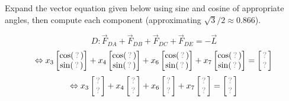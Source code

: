 \begin{activity}{10}
Expand the vector equation given below using sine and cosine of appropriate angles,
then compute each component (approximating \(\sqrt{3}/2\approx 0.866\)).

\drawtruss{\trussStrutVariables}

\[
D:\vec F_{DA}+\vec F_{DB}+\vec F_{DC}+\vec F_{DE}=-\vec L
\]
\[
\Leftrightarrow
x_3\begin{bmatrix}\cos(\unknown)\\\sin(\unknown)\end{bmatrix}+
x_4\begin{bmatrix}\cos(\unknown)\\\sin(\unknown)\end{bmatrix}+
x_6\begin{bmatrix}\cos(\unknown)\\\sin(\unknown)\end{bmatrix}+
x_7\begin{bmatrix}\cos(\unknown)\\\sin(\unknown)\end{bmatrix}=
\begin{bmatrix}\unknown\\\unknown\end{bmatrix}
\]
\[
\Leftrightarrow
x_3\begin{bmatrix}\unknown\\\unknown\end{bmatrix}+
x_4\begin{bmatrix}\unknown\\\unknown\end{bmatrix}+
x_6\begin{bmatrix}\unknown\\\unknown\end{bmatrix}+
x_7\begin{bmatrix}\unknown\\\unknown\end{bmatrix}=
\begin{bmatrix}\unknown\\\unknown\end{bmatrix}
\]

\end{activity}

